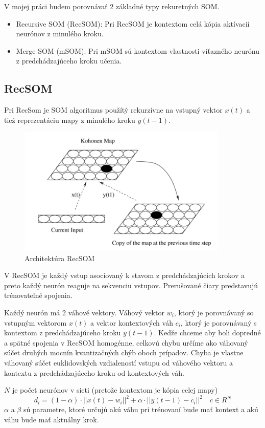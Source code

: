 V mojej práci budem porovnávať 2 základné typy rekuretných SOM.

\begin{itemize}
	\item Recursive SOM (RecSOM):
	Pri RecSOM je kontextom celá kópia aktívacií neurónov z minulého kroku.
	\item Merge SOM (mSOM):
	Pri mSOM sú kontextom vlastnosti víťazného neurónu z predchádzajúceho kroku učenia.
\end{itemize}

\subsection{RecSOM}
Pri RecSom je SOM algoritmus použítý rekurzívne na vstupný vektor $x(t)$ a tiež reprezentáciu mapy
z minulého kroku $y(t-1)$. \cite{Voegtlin:2002:RSM:776097.776102}

\begin{figure}[H]
	\centering
	\includegraphics[width=10cm]{assets/rec_som}
	\caption{Architektúra RecSOM}
\end{figure}

V RecSOM je každý vstup asociovaný k stavom z predchádzajúcich krokov a preto každý 
neurón reaguje na sekvenciu vstupov.
Prerušované čiary predstavujú trénovateľné spojenia.

Každý neurón má 2 váhové vektory. Váhový vektor $w_i$, ktorý je porovnávaný so
vstupným vektorom $x(t)$ a vektor kontextových váh $c_i$, ktorý je porovnávaný s kontextom z predchádzajúceho
kroku $y(t-1)$. Kedže chceme aby boli dopredné a spätné spojenia v RecSOM homogénne, 
celkovú chybu určíme ako váhovaný súčet druhých mocnín kvantizačných chýb oboch prípadov. Chyba je vlastne váhovaný súčet euklidovských vzdialeností
vstupu od váhového vektoru a kontextu z predchádzajúceho kroku od kontextových váh. 

$N$ je počet neurónov v sieti (pretože kontextom je kópia celej mapy)
\begin{equation}
	d_i = (1 - \alpha) \cdot ||x(t) - w_i||^{2} + \alpha \cdot ||y(t-1) - c_i||^{2} \quad c \in R^{N}
\end{equation}
$\alpha$ a $\beta$ sú parametre, ktoré určujú akú váhu pri trénovaní bude mať kontext a akú váhu bude mať
aktuálny krok.

